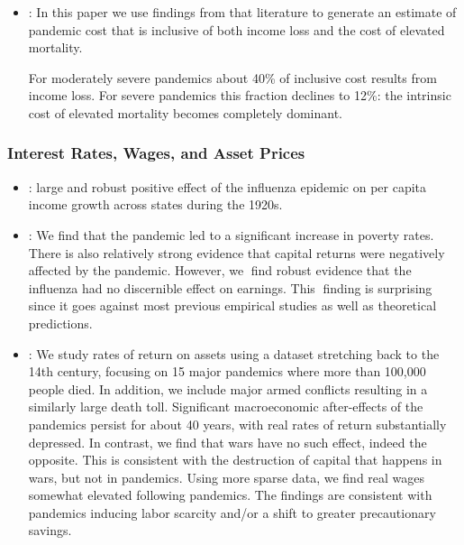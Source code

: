 \documentclass[12pt,a4paper]{article}
\begin{document}
\begin{itemize}
	\item \cite{fanInclusiveCostPandemic2016}: In this paper we use findings from that literature to generate an
	estimate of pandemic cost that is inclusive of both income loss and the cost of elevated mortality.
	
	For moderately severe pandemics about 40\% of inclusive cost results from income loss. For
	severe pandemics this fraction declines to 12\%: the intrinsic cost of elevated mortality becomes
	completely dominant.
\end{itemize}

\subsubsection{Interest Rates, Wages, and Asset Prices}

\begin{itemize}
	\item \cite{brainerdEconomicEffects19182003}: large and robust positive effect of the influenza epidemic on per capita income growth across states during the 1920s. 
	\item \cite{karlssonImpact1918Spanish2014}: We find that the pandemic led to a significant increase in poverty rates.
	There is also relatively strong evidence that capital returns were negatively affected by the	pandemic. However, we find robust evidence that the influenza had no discernible effect on earnings. This finding is surprising since it goes against most previous empirical studies as well as theoretical predictions.
	
	\item \cite{jordaLongerrunEconomicConsequences2020}: We study rates of return on assets
	using a dataset stretching back to the 14th century, focusing on 15 major pandemics
	where more than 100,000 people died. In addition, we include major armed conflicts
	resulting in a similarly large death toll. Significant macroeconomic after-effects of the
	pandemics persist for about 40 years, with real rates of return substantially depressed.
	In contrast, we find that wars have no such effect, indeed the opposite. This is consistent
	with the destruction of capital that happens in wars, but not in pandemics. Using
	more sparse data, we find real wages somewhat elevated following pandemics. The
	findings are consistent with pandemics inducing labor scarcity and/or a shift to greater
	precautionary savings.
\end{itemize}
\end{document}
